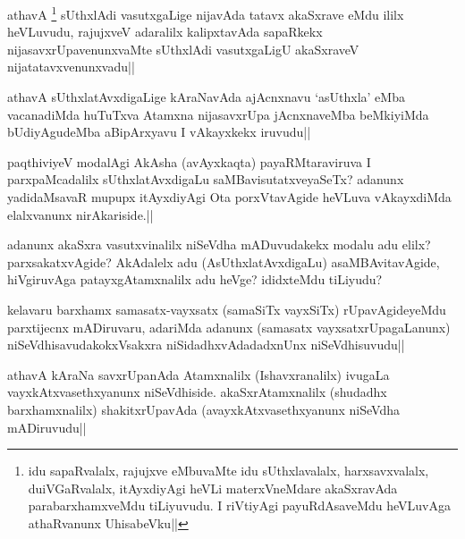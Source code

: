 
\begin{artha}
athavA \footnote[2]{idu sapaRvalalx, rajujxve eMbuvaMte idu sUthxlavalalx, harxsavxvalalx, duiVGaRvalalx, itAyxdiyAgi heVLi materxVneMdare akaSxravAda parabarxhamxveMdu tiLiyuvudu. I riVtiyAgi payuRdAsaveMdu heVLuvAga athaRvanunx UhisabeVku||} sUthxlAdi vasutxgaLige nijavAda tatavx akaSxrave eMdu ililx heVLuvudu, rajujxveV adaralilx kalipxtavAda sapaRkekx nijasavxrUpavenunxvaMte sUthxlAdi vasutxgaLigU akaSxraveV nijatatavxvenunxvadu||
\end{artha}

\begin{artha}
athavA sUthxlatAvxdigaLige kAraNavAda ajAcnxnavu `asUthxla' eMba vacanadiMda huTuTxva Atamxna nijasavxrUpa jAcnxnaveMba beMkiyiMda bUdiyAgudeMba aBipArxyavu I vAkayxkekx iruvudu||
\end{artha}


\begin{artha}%
paqthiviyeV modalAgi AkAsha (avAyxkaqta) payaRMtaraviruva I parxpaMcadalilx sUthxlatAvxdigaLu saMBavisutatxveyaSeTx? adanunx yadidaMsavaR mupupx itAyxdiyAgi Ota porxVtavAgide heVLuva vAkayxdiMda elalxvanunx nirAkariside.||
\end{artha}


\begin{artha}
adanunx akaSxra vasutxvinalilx niSeVdha mADuvudakekx modalu adu elilx? parxsakatxvAgide? AkAdalelx adu (AsUthxlatAvxdigaLu) asaMBAvitavAgide, hiVgiruvAga patayxgAtamxnalilx adu heVge? ididxteMdu tiLiyudu?
\end{artha}


\begin{artha}
kelavaru barxhamx samasatx-vayxsatx (samaSiTx vayxSiTx) rUpavAgideyeMdu parxtijecnx mADiruvaru, adariMda adanunx (samasatx vayxsatxrUpagaLanunx) niSeVdhisavudakokxVsakxra niSidadhxvAdadadxnUnx niSeVdhisuvudu||
\end{artha}

\begin{artha}
athavA kAraNa savxrUpanAda Atamxnalilx (Ishavxranalilx) ivugaLa vayxkAtxvasethxyanunx niSeVdhiside. akaSxrAtamxnalilx (shudadhx barxhamxnalilx) shakitxrUpavAda (avayxkAtxvasethxyanunx niSeVdha mADiruvudu||
\end{artha}

